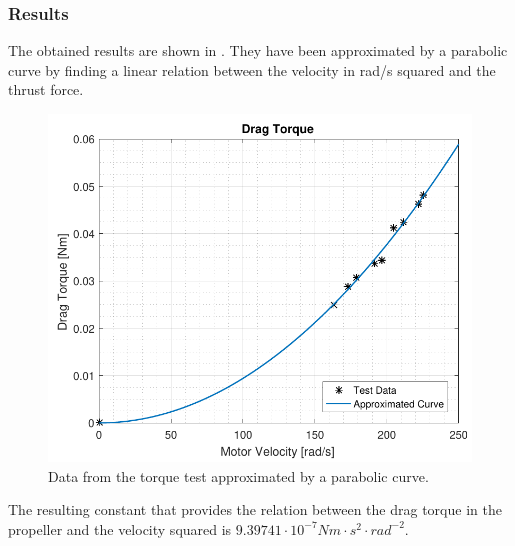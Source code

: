 \subsubsection{Results}
The obtained results are shown in . They have been approximated by a parabolic curve by finding a linear relation between the velocity in rad/s squared and the thrust force.

\begin{figure}[H]
	\centering
	\includegraphics[scale=0.8]{figures/TorqueGraph}
	\caption{Data from the torque test approximated by a parabolic curve.}
	\label{TorqueGraph}
\end{figure}

The resulting constant that provides the relation between the drag torque in the propeller and the velocity squared is $9.39741\cdot10^{-7} Nm\cdot s^2\cdot rad^{-2}$.
